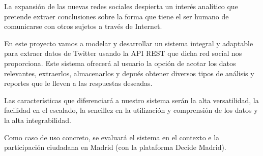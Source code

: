 La expansión de las nuevas redes sociales despierta un interés analítico que pretende extraer conclusiones sobre la forma que tiene el ser humano de comunicarse con otros sujetos a través de Internet.

En este proyecto vamos a modelar y desarrollar un sistema integral y adaptable para extraer datos de Twitter usando la API REST que dicha red social nos proporciona.
Este sistema ofrecerá al usuario la opción de acotar los datos relevantes, extraerlos, almacenarlos y depués obtener diversos tipos de análisis y reportes que le lleven a las respuestas deseadas.

Las características que diferenciará a nuestro sistema serán la alta versatilidad, la facilidad en el escalado, la sencillez en la utilización y comprensión de los datos y la alta integrabilidad.

Como caso de uso concreto, se evaluará el sistema en el contexto e la participación ciudadana en Madrid (con la plataforma Decide Madrid).

